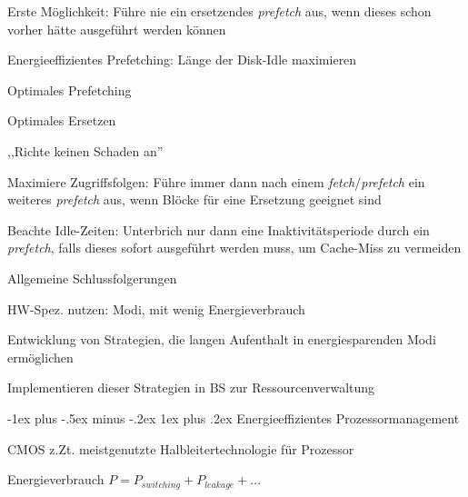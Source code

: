 \documentclass[a4paper]{article}
\makeatletter
\renewcommand{\subsubsection}{\@startsection{subsubsection}{3}{0mm}%
 {-1ex plus -.5ex minus -.2ex}%
 {1ex plus .2ex}%
 {\normalfont\small\bfseries}}
\makeatother
\begin{document}
\begin{multicols}{3}
\begin{itemize*}
\begin{enumerate*}
            \item Erste Möglichkeit: Führe nie ein ersetzendes \emph{prefetch} aus, wenn dieses schon vorher hätte ausgeführt werden können
        \end{enumerate*}
        \item Energieeffizientes Prefetching: Länge der Disk-Idle maximieren
        \begin{enumerate*}
            \item Optimales Prefetching
            \item Optimales Ersetzen
            \item ,,Richte keinen Schaden an''
            \item Maximiere Zugriffsfolgen: Führe immer dann nach einem \emph{fetch}/\emph{prefetch} ein weiteres \emph{prefetch} aus, wenn Blöcke für eine Ersetzung geeignet sind
            \item Beachte Idle-Zeiten: Unterbrich nur dann eine Inaktivitätsperiode durch ein \emph{prefetch}, falls dieses sofort ausgeführt werden muss, um Cache-Miss zu vermeiden
        \end{enumerate*}
    \end{itemize*}

    Allgemeine Schlussfolgerungen
    \begin{enumerate*}
        \item HW-Spez. nutzen: Modi, mit wenig Energieverbrauch
        \item Entwicklung von Strategien, die langen Aufenthalt in energiesparenden Modi ermöglichen%
        \item Implementieren dieser Strategien in BS zur Ressourcenverwaltung
    \end{enumerate*}

    \subsubsection{Energieeffizientes Prozessormanagement}
    \begin{itemize*}
        \item CMOS z.Zt. meistgenutzte Halbleitertechnologie für Prozessor
        \item Energieverbrauch $P = P_{switching} + P_{leakage} + ...$
    \end{itemize*}


\end{multicols}
\end{document}
